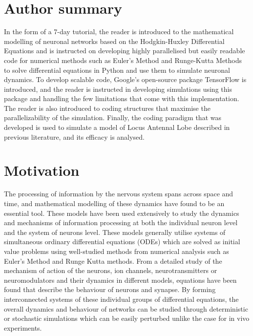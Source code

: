 \documentclass[10pt,letterpaper]{article}
\begin{document}
\section*{Author summary}
In the form of a 7-day tutorial, the reader is introduced to the mathematical modelling of neuronal networks based on the Hodgkin-Huxley Differential Equations and is instructed on developing highly parallelised but easily readable code for numerical methods such as Euler's Method and Runge-Kutta Methods to solve differential equations in Python and use them to simulate neuronal dynamics. To develop scalable code, Google's open-source package TensorFlow is introduced, and the reader is instructed in developing simulations using this package and handling the few limitations that come with this implementation. The reader is also introduced to coding structures that maximise the parallelizability of the simulation. Finally, the coding paradigm that was developed is used to simulate a model of Locus Antennal Lobe described in previous literature, and its efficacy is analysed. 

\linenumbers

\section*{Motivation}
The processing of information by the nervous system spans across space and time, and mathematical modelling of these dynamics have found to be an essential tool. These models have been used extensively to study the dynamics and mechanisms of information processing at both the individual neuron level and the system of neurons level. These models generally utilise systems of simultaneous ordinary differential equations (ODEs) which are solved as initial value problems using well-studied methods from numerical analysis such as Euler's Method and Runge Kutta methods. From a detailed study of the mechanism of action of the neurons, ion channels, neurotransmitters or neuromodulators and their dynamics in different models, equations have been found that describe the behaviour of neurons and synapse. By forming interconnected systems of these individual groups of differential equations, the overall dynamics and behaviour of networks can be studied through deterministic or stochastic simulations which can be easily perturbed unlike the case for in vivo experiments.
\end{document}
